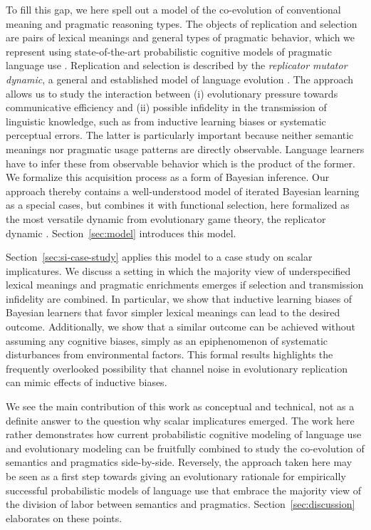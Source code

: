 \documentclass[a4paper]{article}
\begin{document}
To fill this gap, we here spell out a model of the co-evolution of conventional meaning and
pragmatic reasoning types. The objects of replication and selection are pairs of lexical
meanings and general types of pragmatic behavior, which we represent using state-of-the-art
probabilistic cognitive models of pragmatic language use
\citep{frank+goodman:2012,FrankeJager2015:Probabilistic-p,GoodmanFrank2016:Pragmatic-Langu}. Replication
and selection is described by the \emph{replicator mutator dynamic}, a general and established
model of language evolution
\citep{Hofbauer1985:The-Selection-M,nowak+etal:2000,NowakKomarova2001:Evolution-of-Un,hofbauer+sigmund:2003,Nowak2006:Evolutionary-Dy}. The
approach allows us to study the interaction between (i) evolutionary pressure towards
communicative efficiency and (ii) possible infidelity in the transmission of linguistic
knowledge, such as from inductive learning biases or systematic perceptual errors. The latter
is particularly important because neither semantic meanings nor pragmatic usage patterns are
directly observable. Language learners have to infer these from observable behavior which is
the product of the former. We formalize this acquisition process as a form of Bayesian
inference. Our approach thereby contains a well-understood model of iterated Bayesian learning
\citep{griffiths+kalish:2007} as a special cases, but combines it with functional selection,
here formalized as the most versatile dynamic from evolutionary game theory, the replicator
dynamic \citep{TaylorJonker1978:Evolutionary-St}. Section~\ref{sec:model} introduces this
model.

Section~\ref{sec:si-case-study} applies this model to a case study on scalar implicatures. We
discuss a setting in which the majority view of underspecified lexical meanings and pragmatic
enrichments emerges if selection and transmission infidelity are combined. In particular, we
show that inductive learning biases of Bayesian learners that favor simpler lexical meanings
can lead to the desired outcome. Additionally, we show that a similar outcome can be achieved
without assuming any cognitive biases, simply as an epiphenomenon of systematic disturbances from
environmental factors. This formal results highlights the frequently overlooked possibility
that channel noise in evolutionary replication can mimic effects of inductive biases.

We see the main contribution of this work as conceptual and technical, not as a definite answer
to the question why scalar implicatures emerged. The work here rather demonstrates how current
probabilistic cognitive modeling of language use and evolutionary modeling can be fruitfully
combined to study the co-evolution of semantics and pragmatics side-by-side. Reversely, the
approach taken here may be seen as a first step towards giving an evolutionary rationale for
empirically successful probabilistic models of language use that embrace the majority view of
the division of labor between semantics and pragmatics. Section~\ref{sec:discussion} elaborates
on these points.
\end{document}
